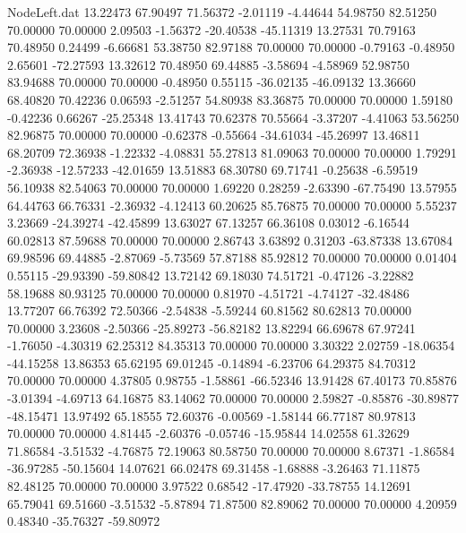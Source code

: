 \begin{filecontents}{NodeLeft.dat}
  13.22473   67.90497   71.56372    -2.01119   -4.44644   54.98750   82.51250   70.00000   70.00000    2.09503   -1.56372  -20.40538  -45.11319
  13.27531   70.79163   70.48950     0.24499   -6.66681   53.38750   82.97188   70.00000   70.00000   -0.79163   -0.48950    2.65601  -72.27593
  13.32612   70.48950   69.44885    -3.58694   -4.58969   52.98750   83.94688   70.00000   70.00000   -0.48950    0.55115  -36.02135  -46.09132
  13.36660   68.40820   70.42236     0.06593   -2.51257   54.80938   83.36875   70.00000   70.00000    1.59180   -0.42236    0.66267  -25.25348
  13.41743   70.62378   70.55664    -3.37207   -4.41063   53.56250   82.96875   70.00000   70.00000   -0.62378   -0.55664  -34.61034  -45.26997
  13.46811   68.20709   72.36938    -1.22332   -4.08831   55.27813   81.09063   70.00000   70.00000    1.79291   -2.36938  -12.57233  -42.01659
  13.51883   68.30780   69.71741    -0.25638   -6.59519   56.10938   82.54063   70.00000   70.00000    1.69220    0.28259   -2.63390  -67.75490
  13.57955   64.44763   66.76331    -2.36932   -4.12413   60.20625   85.76875   70.00000   70.00000    5.55237    3.23669  -24.39274  -42.45899
  13.63027   67.13257   66.36108     0.03012   -6.16544   60.02813   87.59688   70.00000   70.00000    2.86743    3.63892    0.31203  -63.87338
  13.67084   69.98596   69.44885    -2.87069   -5.73569   57.87188   85.92812   70.00000   70.00000    0.01404    0.55115  -29.93390  -59.80842
  13.72142   69.18030   74.51721    -0.47126   -3.22882   58.19688   80.93125   70.00000   70.00000    0.81970   -4.51721   -4.74127  -32.48486
  13.77207   66.76392   72.50366    -2.54838   -5.59244   60.81562   80.62813   70.00000   70.00000    3.23608   -2.50366  -25.89273  -56.82182
  13.82294   66.69678   67.97241    -1.76050   -4.30319   62.25312   84.35313   70.00000   70.00000    3.30322    2.02759  -18.06354  -44.15258
  13.86353   65.62195   69.01245    -0.14894   -6.23706   64.29375   84.70312   70.00000   70.00000    4.37805    0.98755   -1.58861  -66.52346
  13.91428   67.40173   70.85876    -3.01394   -4.69713   64.16875   83.14062   70.00000   70.00000    2.59827   -0.85876  -30.89877  -48.15471
  13.97492   65.18555   72.60376    -0.00569   -1.58144   66.77187   80.97813   70.00000   70.00000    4.81445   -2.60376   -0.05746  -15.95844
  14.02558   61.32629   71.86584    -3.51532   -4.76875   72.19063   80.58750   70.00000   70.00000    8.67371   -1.86584  -36.97285  -50.15604
  14.07621   66.02478   69.31458    -1.68888   -3.26463   71.11875   82.48125   70.00000   70.00000    3.97522    0.68542  -17.47920  -33.78755
  14.12691   65.79041   69.51660    -3.51532   -5.87894   71.87500   82.89062   70.00000   70.00000    4.20959    0.48340  -35.76327  -59.80972

\end{filecontents}
